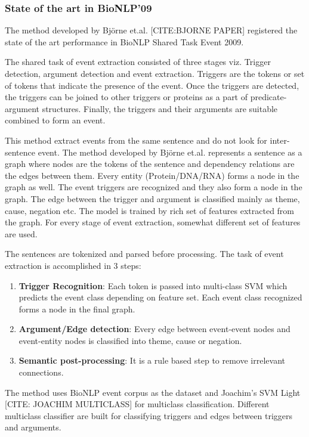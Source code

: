 \subsubsection*{State of the art in BioNLP'09}

The method developed by Björne et.al. [CITE:BJORNE PAPER] registered the state of the art performance in BioNLP Shared Task Event 2009. 

The shared task of event extraction consisted of three stages viz. Trigger detection, argument detection and event extraction. Triggers are the tokens or set of tokens that indicate the presence of the event. Once the triggers are detected, the triggers can be joined to other triggers or proteins as a part of predicate-argument structures. Finally, the triggers and their arguments are suitable combined to form an event.

This method extract events from the same sentence and do not look for inter-sentence event. The method developed by Björne et.al. represents a sentence as a graph where nodes are the tokens of the sentence and dependency relations are the edges between them. Every entity (Protein/DNA/RNA) forms a node in the graph as well. The event triggers are recognized and they also form a node in the graph. The edge between the trigger and argument is classified mainly as theme, cause,  negation etc. The model is trained by rich set of features extracted from the graph. For every stage of event extraction, somewhat different set of features are used. 

The sentences are tokenized and parsed before processing. The task of event extraction is accomplished in 3 steps:

\begin{enumerate}
\item \textbf{Trigger Recognition}: Each token is passed into multi-class SVM which predicts the event class depending on feature set. Each event class recognized forms a node in the final graph.

\item \textbf{Argument/Edge detection}: Every edge between event-event nodes and event-entity nodes is classified into theme, cause or negation.

\item \textbf{Semantic post-processing}: It is a rule based step to remove irrelevant connections. 
\end{enumerate}

The method uses BioNLP event corpus as the dataset and Joachim's SVM Light [CITE: JOACHIM MULTICLASS] for multiclass classification. Different multiclass classifier are built for classifying triggers and edges between triggers and arguments.

